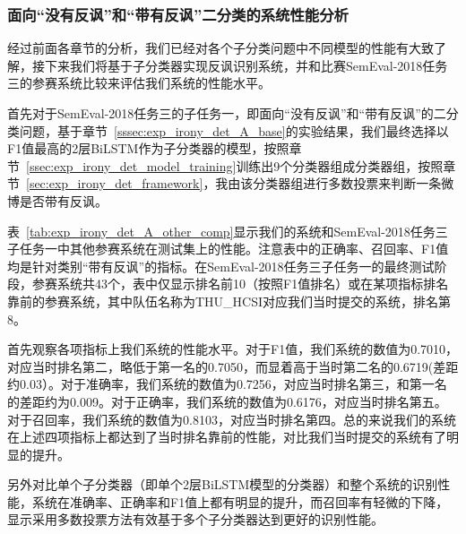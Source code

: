 \subsubsection{面向“没有反讽”和“带有反讽”二分类的系统性能分析}

经过前面各章节的分析，我们已经对各个子分类问题中不同模型的性能有大致了解，接下来我们将基于子分类器实现反讽识别系统，并和比赛SemEval-2018任务三的参赛系统比较来评估我们系统的性能水平。

首先对于SemEval-2018任务三的子任务一，即面向“没有反讽”和“带有反讽”的二分类问题，基于章节~\ref{sssec:exp_irony_det_A_base}的实验结果，我们最终选择以F1值最高的2层BiLSTM作为子分类器的模型，按照章节~\ref{ssec:exp_irony_det_model_training}训练出9个分类器组成分类器组，按照章节~\ref{sec:exp_irony_det_framework}，我由该分类器组进行多数投票来判断一条微博是否带有反讽。

表~\ref{tab:exp_irony_det_A_other_comp}显示我们的系统和SemEval-2018任务三子任务一中其他参赛系统在测试集上的性能。注意表中的正确率、召回率、F1值均是针对类别“带有反讽”的指标。在SemEval-2018任务三子任务一的最终测试阶段，参赛系统共43个，表中仅显示排名前10（按照F1值排名）或在某项指标排名靠前的参赛系统，其中队伍名称为THU\_HCSI对应我们当时提交的系统，排名第8。

首先观察各项指标上我们系统的性能水平。对于F1值，我们系统的数值为0.7010，对应当时排名第二，略低于第一名的0.7050，而显着高于当时第二名的0.6719(差距约0.03）。对于准确率，我们系统的数值为0.7256，对应当时排名第三，和第一名的差距约为0.009。对于正确率，我们系统的数值为0.6176，对应当时排名第五。对于召回率，我们系统的数值为0.8103，对应当时排名第四。总的来说我们的系统在上述四项指标上都达到了当时排名靠前的性能，对比我们当时提交的系统有了明显的提升。

另外对比单个子分类器（即单个2层BiLSTM模型的分类器）和整个系统的识别性能，系统在准确率、正确率和F1值上都有明显的提升，而召回率有轻微的下降，显示采用多数投票方法有效基于多个子分类器达到更好的识别性能。

